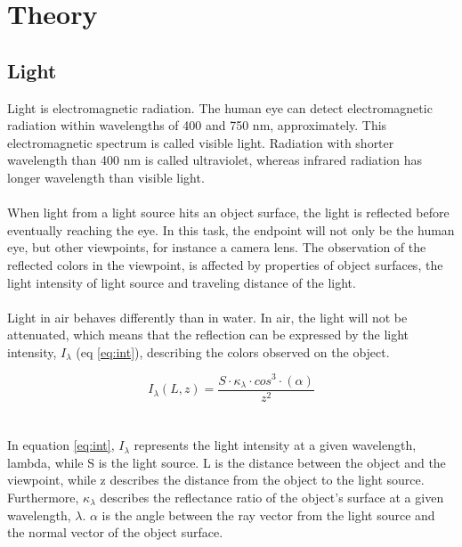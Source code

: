 \chapter{Theory}
\label{chap:theory}



\section{Light}
Light is electromagnetic radiation. The human eye can detect electromagnetic radiation within wavelengths of 400 and 750 nm, approximately. This electromagnetic spectrum is called visible light. Radiation with shorter wavelength than 400 nm is called ultraviolet, whereas infrared radiation has longer wavelength than visible light.
\\\\
When light from a light source hits an object surface, the light is reflected before eventually reaching the eye. In this task, the endpoint will not only be the human eye, but other viewpoints, for instance a camera lens. The observation of the reflected colors in the viewpoint, is affected by properties of object surfaces, the light intensity of light source and traveling distance of the light.
\\\\
Light in air behaves differently than in water. In air, the light will not be attenuated, which means that the reflection can be expressed by the light intensity, $I_ {\lambda}$ (eq \ref{eq:int}), describing the colors observed on the object.

\begin{equation} \label{eq:int}
    I_ {\lambda} (L, z) = \frac{S \cdot \kappa_{\lambda}\cdot cos^{3}\cdot (\alpha)}{z^2}
\end{equation}
\\\\
In equation \ref{eq:int}, $I_{\lambda}$ represents the light intensity at a given wavelength, lambda, while S is the light source. L is the distance between the object and the viewpoint, while z describes the distance from the object to the light source. Furthermore, $\kappa_{\lambda}$ describes the reflectance ratio of the object's surface at a given wavelength, $\lambda$. $\alpha$ is the angle between the ray vector from the light source and the normal vector of the object surface.


